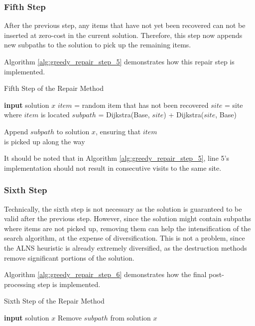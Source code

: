 \documentclass[conference]{IEEEtran}
\begin{document}
\subsubsection{Fifth Step}

After the previous step, any items that have not yet been recovered can not be inserted at zero-cost in the current solution. Therefore, this step now appends new subpaths to the solution to pick up the remaining items.

Algorithm \ref{alg:greedy_repair_step_5} demonstrates how this repair step is implemented.

\begin{algorithm}[h!]
\caption{Fifth Step of the Repair Method}
\label{alg:greedy_repair_step_5}
\begin{algorithmic}[1]
\State \textbf{input} solution $x$
\State $item$ = random item that has not been recovered
\State $site$ = site where $item$ is located
\State $subpath$ = Dijkstra(Base, $site$) + Dijkstra($site$, Base)
\State \parbox[t]{\dimexpr\textwidth-\leftmargin-\labelsep-\labelwidth}{Append $subpath$ to solution $x$, ensuring that $item$\\is picked up along the way\strut}
\EndWhile
\end{algorithmic}
\end{algorithm}

It should be noted that in Algorithm \ref{alg:greedy_repair_step_5}, line 5's implementation should not result in consecutive visits to the same site.

\subsubsection{Sixth Step}

Technically, the sixth step is not necessary as the solution is guaranteed to be valid after the previous step. However, since the solution might contain subpaths where items are not picked up, removing them can help the intensification of the search algorithm, at the expense of diversification. This is not a problem, since the ALNS heuristic is already extremely diversified, as the destruction methods remove significant portions of the solution.

Algorithm \ref{alg:greedy_repair_step_6} demonstrates how the final post-processing step is implemented.

\begin{algorithm}[h!]
\caption{Sixth Step of the Repair Method}
\label{alg:greedy_repair_step_6}
\begin{algorithmic}[1]
\State \textbf{input} solution $x$
\State Remove $subpath$ from solution $x$
\EndIf
\EndFor
\end{algorithmic}
\end{algorithm}
\end{document}
